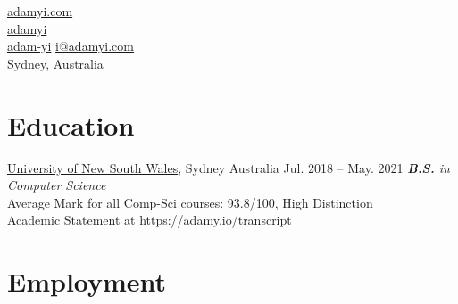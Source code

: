 \documentclass[hidelinks__VERSION__]{adamyi-cv}
\begin{document}

{\href{https://www.adamyi.com}{\faGlobe \hspace{0.1em} adamyi.com}\\
\href{https://github.com/adamyi}{\faGithub \hspace{0.1em} adamyi}\\
\href{https://linkedin.com/in/adam-yi}{\faLinkedin \hspace{0.1em} adam-yi}}
{\href{mailto:i@adamyi.com}{i@adamyi.com}\\
Sydney, Australia}


\section{Education}

\begin{entrylist}


\entry
{\href{https://unsw.edu.au}{University of New South Wales}, Sydney Australia}
{Jul. 2018 -- May. 2021}
{\emph{\textbf{B.S.} in Computer Science}\\
Average Mark for all Comp-Sci courses: 93.8/100, High Distinction\\
Academic Statement at \href{https://adamy.io/transcript}{https://adamy.io/transcript}
}

\end{entrylist}


\section{Employment}
\end{document}
